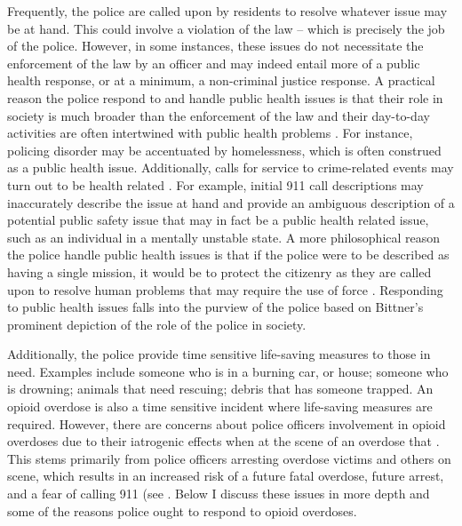 Frequently, the police are called upon by residents to resolve whatever issue may be at hand. This could involve a violation of the law – which is precisely the job of the police. However, in some instances, these issues do not necessitate the enforcement of the law by an officer and may indeed entail more of a public health response, or at a minimum, a non-criminal justice response. A practical reason the police respond to and handle public health issues is that their role in society is much broader than the enforcement of the law and their day-to-day activities are often intertwined with public health problems \parencite{wood_private_2020}. For instance, policing disorder may be accentuated by homelessness, which is often construed as a public health issue. Additionally, calls for service to crime-related events may turn out to be health related \parencite{ratcliffe_policing_2021}. For example, initial 911 call descriptions may inaccurately describe the issue at hand and provide an ambiguous description of a potential public safety issue that may in fact be a public health related issue, such as an individual in a mentally unstable state. A more philosophical reason the police handle public health issues is that if the police were to be described as having a single mission, it would be to protect the citizenry as they are called upon to resolve human problems that may require the use of force \parencite{bittner_functions_1970, skolnick_above_1993}. Responding to public health issues falls into the purview of the police based on Bittner’s prominent depiction of the role of the police in society.

Additionally, the police provide time sensitive life-saving measures to those in need. Examples include someone who is in a burning car, or house; someone who is drowning; animals that need rescuing; debris that has someone trapped. An opioid overdose is also a time sensitive incident where life-saving measures are required. However, there are concerns about police officers involvement in opioid overdoses due to their iatrogenic effects when at the scene of an overdose that . This stems primarily from police officers arresting overdose victims and others on scene, which results in an increased risk of a future fatal overdose, future arrest, and a fear of calling 911 (see \cite{binswanger_clinical_2016, bohnert_policing_2011, lowder_twoyear_2020, van_der_meulen_thats_2021}. Below I discuss these issues in more depth and some of the reasons police ought to respond to opioid overdoses. 

